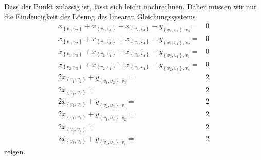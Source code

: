 \documentclass[10p,a4paper,BCOR = 12mm, DIV=15]{scrbook}
\begin{document}
\begin{bew}
Dass der Punkt zulässig ist, lässt sich leicht nachrechnen. Daher müssen wir nur die Eindeutigkeit der Lösung des linearen Gleichungssystems
{
\allowdisplaybreaks
\begin{align*}
x_{\left\{v_1, v_2\right\}} + x_{\left\{v_1, v_3\right\}} + x_{\left\{v_2, v_3\right\}} - y_{\left\{v_1, v_2\right\}, v_3}
 = & 0 \\
x_{\left\{v_1, v_2\right\}} + x_{\left\{v_1, v_4\right\}} + x_{\left\{v_2, v_4\right\}}
 - y_{\left\{v_1, v_4\right\}, v_2}
 = & 0 \\
x_{\left\{v_1, v_3\right\}} + x_{\left\{v_1, v_4\right\}} + x_{\left\{v_3, v_4\right\}}
 - y_{\left\{v_3, v_4\right\}, v_1} = & 0 \\
x_{\left\{v_2, v_3\right\}} + x_{\left\{v_2, v_4\right\}} + x_{\left\{v_3, v_4\right\}} - y_{\left\{v_2, v_3\right\}, v_4}
 = & 0 \\
2 x_{\left\{v_1, v_2\right\}} + y_{\left\{v_1, v_2\right\}, v_3} 
 = & 2 \\
2 x_{\left\{v_1, v_3\right\}} 
 = & 2 \\
2 x_{\left\{v_2, v_3\right\}}
 + y_{\left\{v_2, v_3\right\}, v_4} = & 2 \\
2 x_{\left\{v_1, v_4\right\}} + y_{\left\{v_1, v_4\right\}, v_2}
 = & 2 \\
2 x_{\left\{v_2, v_4\right\}}
 = & 2 \\
2 x_{\left\{v_3, v_4\right\}} + y_{\left\{v_3, v_4\right\}, v_1}
 = & 2
\end{align*}
}
zeigen.


\end{bew}
\end{document}
